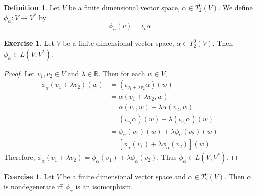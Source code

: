 \documentclass{book}
\theoremstyle{definition}
\newtheorem{defn}[definition]{Definition}
\newtheorem{ex}[definition]{Exercise}
\newcommand{\al}{\alpha}
\newcommand{\lam}{\lambda}
\newcommand{\R}{\mathbb{R}}
\DeclareMathOperator*{\0}{\mbf{0}}
\DeclareMathOperator*{\1}{\mbf{1}}
\begin{document}
	\begin{defn}
		Let $V$ be a finite dimensional vector space, $\al \in T^0_2(V)$. We define $\phi_{\al}: V \rightarrow V^*$ by 
		$$ \phi_{\al}(v) = \iota_v \al $$
	\end{defn}	

	\begin{ex}
		Let $V$ be a finite dimensional vector space, $\al \in T^0_2(V)$. Then $\phi_{\al} \in L(V;V^*)$.
	\end{ex}

	\begin{proof}
		Let $v_1, v_2 \in V$ and $\lam \in \R$. Then for each $w \in V$,
		\begin{align*}
			\phi_{\al}(v_1 + \lam v_2) (w)
			& = (\iota_{v_1 + \lam v_2} \al) (w) \\
			& = \al (v_1 + \lam v_2, w) \\
			& = \al(v_1, w) + \lam \al(v_2, w) \\
			& = (\iota_{v_1} \al) (w) + \lam (\iota_{v_2} \al) (w) \\
			& = \phi_{\al}(v_1)(w) + \lam \phi_{\al}(v_2)(w) \\
			& = [\phi_{\al}(v_1) + \lam \phi_{\al}(v_2)](w)
		\end{align*}
		Therefore, $\phi_{\al}(v_1 + \lam v_2) = \phi_{\al}(v_1) + \lam \phi_{\al}(v_2)$. Thus $\phi_{\al} \in L(V; V^*)$.
	\end{proof}

	\begin{ex}
		Let $V$ be a finite dimensional vector space and $\al \in T^0_2(V)$. Then $\al$ is nondegenerate iff $\phi_{\al}$ is an isomorphism. 
	\end{ex}
\end{document}
